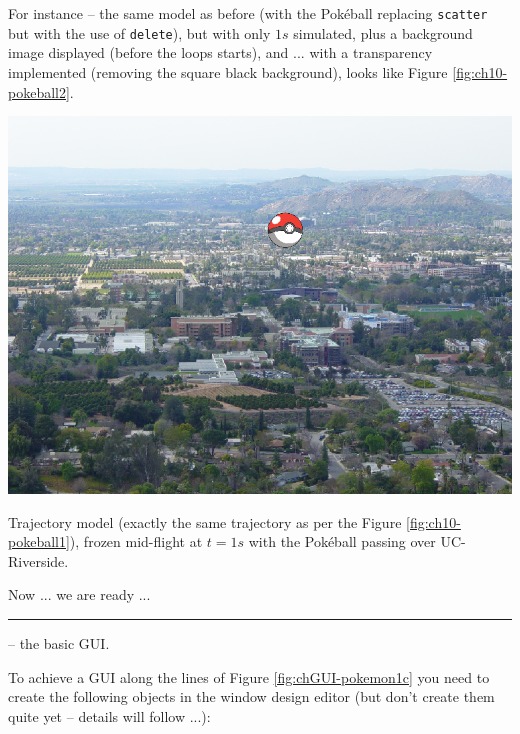 \documentclass{tufte-book} %
\begin{document}
For instance -- the same model as before (with the Pok\'eball replacing \texttt{scatter} but with the use of \texttt{delete}), but with only \(1s\) simulated, plus a background image displayed (before the loops starts), and ... with a transparency implemented (removing the square black background), looks like Figure \ref{fig:ch10-pokeball2}.

\begin{marginfigure}[1.5in]
\includegraphics[width=\linewidth]{ch10-pokeball2.png}
\caption{Trajectory model (exactly the same trajectory as per the Figure \ref{fig:ch10-pokeball1}), frozen mid-flight at \(t=1s\) with the Pok\'eball passing over UC-Riverside.}
\label{fig:ch10-pokeball2}
\end{marginfigure}

Now ... we are ready ...

\vspace{1mm}
\noindent\rule{4cm}{0.5pt}
\vspace{-2mm}

 -- the basic GUI.

To achieve a GUI along the lines of Figure \ref{fig:chGUI-pokemon1c} you need to create the following objects in the window design editor (but don't create them quite yet -- details will follow ...):
\end{document}

